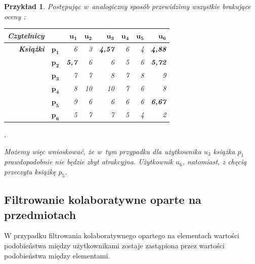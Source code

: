 \documentclass[12pt,a4paper]{report}
\newtheorem{przyklad}{Przykład}[chapter]{\normalfont}
\begin{document}
\begin{przyklad}
Postępując w~analogiczny sposób przewidzimy wszystkie brakujące oceny :
\begin{center}
\begin{tabular}{|r|r|r|r|r|r|r|r|} \hline
\textbf{Czytelnicy} & & $\mathbf{u_1}$ & $\mathbf{u_2}$ & $\mathbf{u_3}$ & $\mathbf{u_4}$ & $\mathbf{u_5}$ & $\mathbf{u_6}$ \\
\hline
\hline
\textbf{Książki} &$\mathbf{p_1}$ & 6 & 3 & \textbf{4,57} & 6 & 4 & \textbf{4,88} \\
\hline
&$\mathbf{p_2}$ & \textbf{5,7} & 6 & 6 & 5 & 6 & \textbf{5,72} \\
\hline
&$\mathbf{p_3}$ & 7 & 7 & 8 & 7 & 8 & 9 \\
\hline
&$\mathbf{p_4}$ & 8 & 10 & 10 & 7 & 6 & 8 \\
\hline
&$\mathbf{p_5}$ & 9 & 6 & 6 & 6 & 6 & \textbf{6,67}  \\
\hline
&$\mathbf{p_6}$ & 5 & 7 & 7 & 5 & 4 & 2 \\
\hline
\end{tabular}.
\end{center}
Możemy więc wnioskować, że w~tym przypadku dla użytkownika $u_3$ książka $p_1$ prawdopodobnie nie będzie zbyt atrakcyjna. Użytkownik $u_6$, natomiast, z chęcią przeczyta książkę $p_5$. 
\end{przyklad}

\subsection{Filtrowanie kolaboratywne oparte na  przedmiotach}
W przypadku filtrowania kolaboratywnego opartego na elementach wartości podobieństwa między użytkownikami zostaje zastąpiona przez wartości podobieństwa między elementami.
\end{document}
